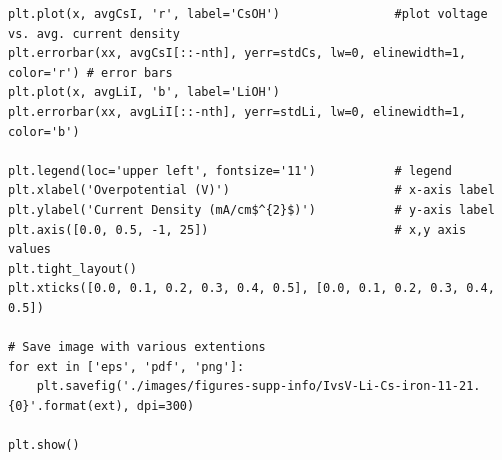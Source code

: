 \documentclass[journal=jpccck,manuscript=suppinfo,email=true]{achemso}
\begin{document}
\begin{verbatim}
plt.plot(x, avgCsI, 'r', label='CsOH')                #plot voltage vs. avg. current density
plt.errorbar(xx, avgCsI[::-nth], yerr=stdCs, lw=0, elinewidth=1, color='r') # error bars
plt.plot(x, avgLiI, 'b', label='LiOH')
plt.errorbar(xx, avgLiI[::-nth], yerr=stdLi, lw=0, elinewidth=1, color='b')

plt.legend(loc='upper left', fontsize='11')           # legend
plt.xlabel('Overpotential (V)')                       # x-axis label
plt.ylabel('Current Density (mA/cm$^{2}$)')           # y-axis label
plt.axis([0.0, 0.5, -1, 25])                          # x,y axis values
plt.tight_layout()
plt.xticks([0.0, 0.1, 0.2, 0.3, 0.4, 0.5], [0.0, 0.1, 0.2, 0.3, 0.4, 0.5])

# Save image with various extentions
for ext in ['eps', 'pdf', 'png']:
    plt.savefig('./images/figures-supp-info/IvsV-Li-Cs-iron-11-21.{0}'.format(ext), dpi=300)

plt.show()
\end{verbatim}
\end{document}
